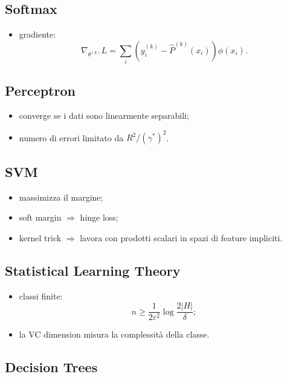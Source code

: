 \documentclass[
]{article}
\providecommand{\tightlist}{%
  \setlength{\itemsep}{0pt}\setlength{\parskip}{0pt}}
\begin{document}
\subsection{Softmax}\label{softmax}

\begin{itemize}
\tightlist
\item
  gradiente: \[
  \nabla_{\theta^{(k)}}L
  =
  \sum_i (y_i^{(k)}-\hat P^{(k)}(x_i))\phi(x_i).
  \]
\end{itemize}

\subsection{Perceptron}\label{perceptron}

\begin{itemize}
\tightlist
\item
  converge se i dati sono linearmente separabili;
\item
  numero di errori limitato da \(R^2/(\gamma^*)^2\).
\end{itemize}

\subsection{SVM}\label{svm}

\begin{itemize}
\tightlist
\item
  massimizza il margine;
\item
  soft margin \(\Rightarrow\) hinge loss;
\item
  kernel trick \(\Rightarrow\) lavora con prodotti scalari in spazi di
  feature impliciti.
\end{itemize}

\subsection{Statistical Learning
Theory}\label{statistical-learning-theory}

\begin{itemize}
\tightlist
\item
  classi finite: \[
  n \ge \frac{1}{2\varepsilon^2}\log\frac{2|H|}{\delta};
  \]
\item
  la VC dimension misura la complessità della classe.
\end{itemize}

\subsection{Decision Trees}\label{decision-trees}
\end{document}
